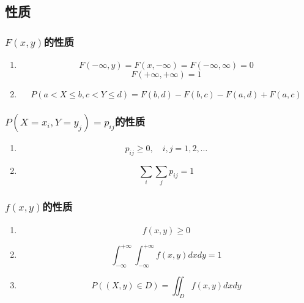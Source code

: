 \subsection{性质} %
\label{sub:性质}
\subsubsection{$F(x,y)$的性质}
\begin{enumerate}
	\item
	\begin{equation}
		F(-\infty, y) = F(x, -\infty) = F(-\infty, \infty) = 0
	\end{equation}
	\begin{equation}
		F(+\infty, +\infty) = 1
	\end{equation}

	\item 
	\begin{equation}
		P(a<X\leq b, c<Y\leq d) = F(b,d) - F(b,c) - F(a,d) + F(a,c)
	\end{equation}
\end{enumerate}

\subsubsection{$P(X=x_i, Y=y_j)=p_{ij}$的性质}
\begin{enumerate}
	\item 
	\begin{equation}
		p_{ij} \geq 0, \quad i,j = 1,2, \dots
	\end{equation}

	\item 
	\begin{equation}
		\sum_i \sum_j p_{ij} = 1
	\end{equation}
\end{enumerate}

\subsubsection{$f(x,y)$的性质}
\begin{enumerate}
	\item 
	\begin{equation}
		f(x, y) \geq 0
	\end{equation}
	\item 
	\begin{equation}
		\int_{-\infty}^{+\infty} \int_{-\infty}^{+\infty}f(x,y)dxdy = 1
	\end{equation}
	\item 
	\begin{equation}
		P((X,y)\in D) = \iint_Df(x,y) dxdy
	\end{equation}
	
\end{enumerate}


